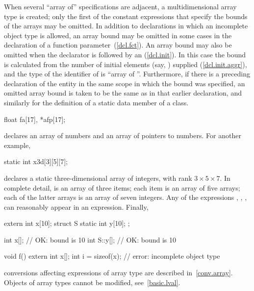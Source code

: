 \pnum
When several ``array of'' specifications are adjacent, a multidimensional
array type is created;
only the first of
the constant expressions that specify the bounds
of the arrays may be omitted.
In addition to declarations in which an incomplete object type is allowed,
an array bound may be omitted in some cases in the declaration of a function
parameter~(\ref{dcl.fct}).
An array bound may
also be omitted
when the declarator is followed by an
(\ref{dcl.init}).
In this case the bound is calculated from the number
%
of initial elements (say,
)
supplied
(\ref{dcl.init.aggr}), and the type of the identifier of
is ``array of
''.
Furthermore, if there is a preceding declaration of the entity in the same
scope in which the bound was specified, an omitted array bound is taken to
be the same as in that earlier declaration, and similarly for the definition
of a static data member of a class.

\pnum
\enterexample
{}%
%
\begin{codeblock}
float fa[17], *afp[17];
\end{codeblock}

declares an array of
numbers and an array of
pointers to
numbers.
%
For another example,

\begin{codeblock}
static int x3d[3][5][7];
\end{codeblock}

declares a static three-dimensional array of integers,
with rank $3 \times 5 \times 7$.
In complete detail,
is an array of three items;
each item is an array of five arrays;
each of the latter arrays is an array of seven
integers.
Any of the expressions
,
,
,
can reasonably appear in an expression. Finally,
\begin{codeblock}
extern int x[10];
struct S {
  static int y[10];
};

int x[];                      // OK: bound is 10
int S::y[];                   // OK: bound is 10

void f() {
  extern int x[];
  int i = sizeof(x);          // error: incomplete object type
}
\end{codeblock}
\exitexample

\pnum
\enternote
conversions affecting expressions of array type are described in~\ref{conv.array}.
Objects of array types cannot be modified, see~\ref{basic.lval}.
\exitnote


